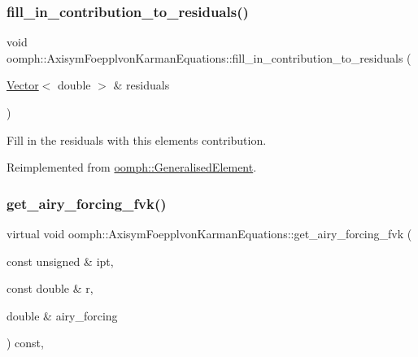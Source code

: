 \subsubsection{\texorpdfstring{fill\+\_\+in\+\_\+contribution\+\_\+to\+\_\+residuals()}{fill\_in\_contribution\_to\_residuals()}\hspace{0.1cm}{\footnotesize\ttfamily [2/2]}}
{\footnotesize\ttfamily void oomph\+::\+Axisym\+Foepplvon\+Karman\+Equations\+::fill\+\_\+in\+\_\+contribution\+\_\+to\+\_\+residuals (\begin{DoxyParamCaption}\item[{\hyperlink{classoomph_1_1Vector}{Vector}$<$ double $>$ \&}]{residuals }\end{DoxyParamCaption})\hspace{0.3cm}{\ttfamily [virtual]}}



Fill in the residuals with this element\textquotesingle{}s contribution. 



Reimplemented from \hyperlink{classoomph_1_1GeneralisedElement_a310c97f515e8504a48179c0e72c550d7}{oomph\+::\+Generalised\+Element}.

\mbox{\label{classoomph_1_1AxisymFoepplvonKarmanEquations_aecb0dc1f5c1da058c7519ed64f2748c1}} 
\subsubsection{\texorpdfstring{get\+\_\+airy\+\_\+forcing\+\_\+fvk()}{get\_airy\_forcing\_fvk()}}
{\footnotesize\ttfamily virtual void oomph\+::\+Axisym\+Foepplvon\+Karman\+Equations\+::get\+\_\+airy\+\_\+forcing\+\_\+fvk (\begin{DoxyParamCaption}\item[{const unsigned \&}]{ipt,  }\item[{const double \&}]{r,  }\item[{double \&}]{airy\+\_\+forcing }\end{DoxyParamCaption}) const\hspace{0.3cm}{\ttfamily [inline]}, {\ttfamily [virtual]}}



